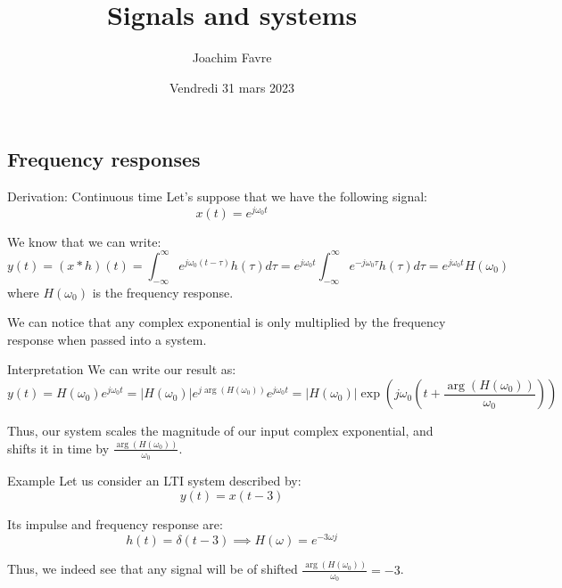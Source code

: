 \documentclass[a4paper]{article}
\title{Signals and systems}
\author{Joachim Favre}
\date{Vendredi 31 mars 2023}
\begin{document}
\maketitle


\subsection{Frequency responses}
\begin{parag}{Derivation: Continuous time}
    Let's suppose that we have the following signal: 
    \[x\left(t\right) = e^{j \omega_0 t}\]
    
    We know that we can write: 
    \[y\left(t\right) = \left(x * h\right)\left(t\right) = \int_{-\infty}^{\infty} e^{j \omega_0 \left(t- \tau\right)} h\left(\tau\right)d \tau = e^{j \omega_0 t} \int_{-\infty}^{\infty} e^{-j \omega_0 \tau} h\left(\tau\right) d\tau = e^{j\omega_0 t} H\left(\omega_0\right)\]
    where $H\left(\omega_0\right)$ is the frequency response.

    We can notice that any complex exponential is only multiplied by the frequency response when passed into a system.
\end{parag}

\begin{parag}{Interpretation}
    We can write our result as:
    \[y\left(t\right) = H\left(\omega_0\right) e^{j \omega_0 t} = \left|H\left(\omega_0\right)\right| e^{j \arg\left(H\left(\omega_0\right)\right)} e^{j \omega_0 t} = \left|H\left(\omega_0\right)\right| \exp\left(j \omega_0 \left(t + \frac{\arg\left(H\left(\omega_0\right)\right)}{\omega_0}\right)\right)\]
    
    Thus, our system scales the magnitude of our input complex exponential, and shifts it in time by $\frac{\arg\left(H\left(\omega_0\right)\right)}{\omega_0}$.
\end{parag}

\begin{parag}{Example}
    Let us consider an LTI system described by: 
    \[y\left(t\right) = x\left(t - 3\right)\]
    
    Its impulse and frequency response are: 
    \[h\left(t\right) = \delta\left(t - 3\right) \implies H\left(\omega\right) = e^{-3 \omega j}\]

    Thus, we indeed see that any signal will be of shifted $\frac{\arg\left(H\left(\omega_0\right)\right)}{\omega_0} = -3$.
\end{parag}
\end{document}
